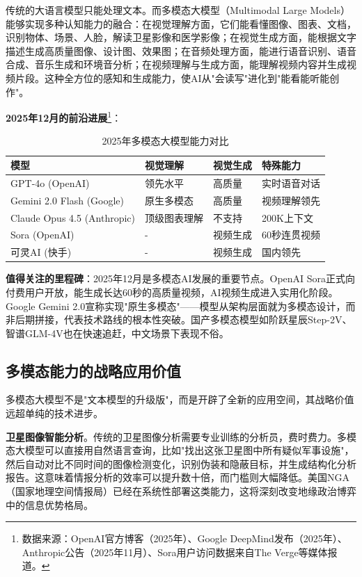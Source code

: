 传统的大语言模型只能处理文本。而多模态大模型（Multimodal Large Models）能够实现多种认知能力的融合：在视觉理解方面，它们能看懂图像、图表、文档，识别物体、场景、人脸，解读卫星影像和医学影像；在视觉生成方面，能根据文字描述生成高质量图像、设计图、效果图；在音频处理方面，能进行语音识别、语音合成、音乐生成和环境音分析；在视频理解与生成方面，能理解视频内容并生成视频片段。这种全方位的感知和生成能力，使AI从"会读写"进化到"能看能听能创作"。

\textbf{2025年12月的前沿进展}\footnote{数据来源：OpenAI官方博客（2025年）、Google DeepMind发布（2025年）、Anthropic公告（2025年11月）、Sora用户访问数据来自The Verge等媒体报道。}：

\begin{table}[H]
\centering
\caption{2025年多模态大模型能力对比}
\small
\begin{tabular}{p{2.5cm}p{3cm}p{3cm}p{3.5cm}}
\toprule
\textbf{模型} & \textbf{视觉理解} & \textbf{视觉生成} & \textbf{特殊能力} \\
\midrule
GPT-4o (OpenAI) & 领先水平 & 高质量 & 实时语音对话 \\
Gemini 2.0 Flash (Google) & 原生多模态 & 高质量 & 视频理解领先 \\
Claude Opus 4.5 (Anthropic) & 顶级图表理解 & 不支持 & 200K上下文 \\
Sora (OpenAI) & - & 视频生成 & 60秒连贯视频 \\
可灵AI (快手) & - & 视频生成 & 国内领先 \\
\bottomrule
\end{tabular}
\end{table}

\textbf{值得关注的里程碑}：2025年12月是多模态AI发展的重要节点。OpenAI Sora正式向付费用户开放，能生成长达60秒的高质量视频，AI视频生成进入实用化阶段。Google Gemini 2.0宣称实现"原生多模态"——模型从架构层面就为多模态设计，而非后期拼接，代表技术路线的根本性突破。国产多模态模型如阶跃星辰Step-2V、智谱GLM-4V也在快速追赶，中文场景下表现不俗。

\subsection{多模态能力的战略应用价值}

多模态大模型不是"文本模型的升级版"，而是开辟了全新的应用空间，其战略价值远超单纯的技术进步。

\textbf{卫星图像智能分析}。传统的卫星图像分析需要专业训练的分析员，费时费力。多模态大模型可以直接用自然语言查询，比如"找出这张卫星图中所有疑似军事设施"，然后自动对比不同时间的图像检测变化，识别伪装和隐蔽目标，并生成结构化分析报告。这意味着情报分析的效率可以提升数十倍，而门槛则大幅降低。美国NGA（国家地理空间情报局）已经在系统性部署这类能力，这将深刻改变地缘政治博弈中的信息优势格局。

